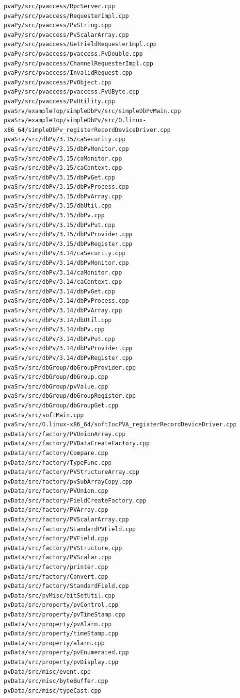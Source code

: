\documentclass[11pt
  , a4paper
  , article
  , oneside
]{memoir}
\begin{document}
\begin{lstlisting}[style=termstylenumber, caption={Code List}, label={list:nfsroot-file}]
pvaPy/src/pvaccess/RpcServer.cpp
pvaPy/src/pvaccess/RequesterImpl.cpp
pvaPy/src/pvaccess/PvString.cpp
pvaPy/src/pvaccess/PvScalarArray.cpp
pvaPy/src/pvaccess/GetFieldRequesterImpl.cpp
pvaPy/src/pvaccess/pvaccess.PvDouble.cpp
pvaPy/src/pvaccess/ChannelRequesterImpl.cpp
pvaPy/src/pvaccess/InvalidRequest.cpp
pvaPy/src/pvaccess/PvObject.cpp
pvaPy/src/pvaccess/pvaccess.PvUByte.cpp
pvaPy/src/pvaccess/PvUtility.cpp
pvaSrv/exampleTop/simpleDbPv/src/simpleDbPvMain.cpp
pvaSrv/exampleTop/simpleDbPv/src/O.linux-x86_64/simpleDbPv_registerRecordDeviceDriver.cpp
pvaSrv/src/dbPv/3.15/caSecurity.cpp
pvaSrv/src/dbPv/3.15/dbPvMonitor.cpp
pvaSrv/src/dbPv/3.15/caMonitor.cpp
pvaSrv/src/dbPv/3.15/caContext.cpp
pvaSrv/src/dbPv/3.15/dbPvGet.cpp
pvaSrv/src/dbPv/3.15/dbPvProcess.cpp
pvaSrv/src/dbPv/3.15/dbPvArray.cpp
pvaSrv/src/dbPv/3.15/dbUtil.cpp
pvaSrv/src/dbPv/3.15/dbPv.cpp
pvaSrv/src/dbPv/3.15/dbPvPut.cpp
pvaSrv/src/dbPv/3.15/dbPvProvider.cpp
pvaSrv/src/dbPv/3.15/dbPvRegister.cpp
pvaSrv/src/dbPv/3.14/caSecurity.cpp
pvaSrv/src/dbPv/3.14/dbPvMonitor.cpp
pvaSrv/src/dbPv/3.14/caMonitor.cpp
pvaSrv/src/dbPv/3.14/caContext.cpp
pvaSrv/src/dbPv/3.14/dbPvGet.cpp
pvaSrv/src/dbPv/3.14/dbPvProcess.cpp
pvaSrv/src/dbPv/3.14/dbPvArray.cpp
pvaSrv/src/dbPv/3.14/dbUtil.cpp
pvaSrv/src/dbPv/3.14/dbPv.cpp
pvaSrv/src/dbPv/3.14/dbPvPut.cpp
pvaSrv/src/dbPv/3.14/dbPvProvider.cpp
pvaSrv/src/dbPv/3.14/dbPvRegister.cpp
pvaSrv/src/dbGroup/dbGroupProvider.cpp
pvaSrv/src/dbGroup/dbGroup.cpp
pvaSrv/src/dbGroup/pvValue.cpp
pvaSrv/src/dbGroup/dbGroupRegister.cpp
pvaSrv/src/dbGroup/dbGroupGet.cpp
pvaSrv/src/softMain.cpp
pvaSrv/src/O.linux-x86_64/softIocPVA_registerRecordDeviceDriver.cpp
pvData/src/factory/PVUnionArray.cpp
pvData/src/factory/PVDataCreateFactory.cpp
pvData/src/factory/Compare.cpp
pvData/src/factory/TypeFunc.cpp
pvData/src/factory/PVStructureArray.cpp
pvData/src/factory/pvSubArrayCopy.cpp
pvData/src/factory/PVUnion.cpp
pvData/src/factory/FieldCreateFactory.cpp
pvData/src/factory/PVArray.cpp
pvData/src/factory/PVScalarArray.cpp
pvData/src/factory/StandardPVField.cpp
pvData/src/factory/PVField.cpp
pvData/src/factory/PVStructure.cpp
pvData/src/factory/PVScalar.cpp
pvData/src/factory/printer.cpp
pvData/src/factory/Convert.cpp
pvData/src/factory/StandardField.cpp
pvData/src/pvMisc/bitSetUtil.cpp
pvData/src/property/pvControl.cpp
pvData/src/property/pvTimeStamp.cpp
pvData/src/property/pvAlarm.cpp
pvData/src/property/timeStamp.cpp
pvData/src/property/alarm.cpp
pvData/src/property/pvEnumerated.cpp
pvData/src/property/pvDisplay.cpp
pvData/src/misc/event.cpp
pvData/src/misc/byteBuffer.cpp
pvData/src/misc/typeCast.cpp

\end{lstlisting}
\end{document}
